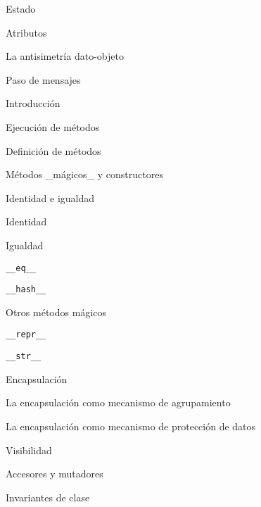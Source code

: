 \begin{longenum}
\begin{longenum}
\begin{longenum}
            \item Estado
            \begin{longenum}
                \item Atributos
            \end{longenum}
            \item La antisimetría dato-objeto
        \end{longenum}
        \item Paso de mensajes
        \begin{longenum}
            \item Introducción
            \item Ejecución de métodos
            \item Definición de métodos
            \item Métodos \_mágicos\_ y constructores
        \end{longenum}
        \item Identidad e igualdad
        \begin{longenum}
            \item Identidad
            \item Igualdad
            \begin{longenum}
                \item \texttt{\_\_eq\_\_}
                \item \texttt{\_\_hash\_\_}
            \end{longenum}
            \item Otros métodos mágicos
            \begin{longenum}
                \item \texttt{\_\_repr\_\_}
                \item \texttt{\_\_str\_\_}
            \end{longenum}
        \end{longenum}
        \item Encapsulación
        \begin{longenum}
            \item La encapsulación como mecanismo de agrupamiento
            \item La encapsulación como mecanismo de protección de datos
            \begin{longenum}
                \item Visibilidad
                \item Accesores y mutadores
                \item Invariantes de clase

\end{longenum}
\end{longenum}
\end{longenum}
\end{longenum}
